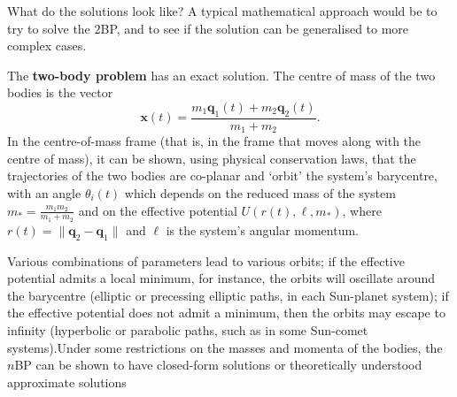 \newpage\noindent What do the solutions look like? A typical mathematical approach would be to try to solve the 2BP, and to see if the solution can be generalised to more complex cases. \par The \textbf{two-body problem} has an exact solution. The centre of mass of the two bodies is the vector $$\mathbf{x}(t)=\frac{m_1\mathbf{q}_1(t)+m_2\mathbf{q}_2(t)}{m_1+m_2}.$$ In the centre-of-mass frame (that is, in the frame that moves along with the centre of mass), it can be shown, using physical conservation laws, that the trajectories of the two bodies are co-planar and `orbit' the system's barycentre, with an angle $\theta_i(t)$ which depends on the reduced mass of the system $m_*=\frac{m_1m_2}{m_1+m_2}$ and on the effective potential $U(r(t),\ell,m_*)$, where $r(t)=\|\mathbf{q}_2-\mathbf{q}_1\|$ and $\ell$ is the system's angular momentum. \par Various combinations of parameters lead to various orbits; if the effective potential admits a local minimum, for instance, the orbits will oscillate around the barycentre (elliptic or precessing elliptic paths, in each Sun-planet system); if the effective potential does not admit a minimum, then the orbits may escape to infinity (hyperbolic or parabolic paths, such as in some Sun-comet systems).\newl  Under some restrictions on the masses and momenta of the bodies, the $n$BP can be shown to have closed-form solutions or theoretically understood approximate solutions 
